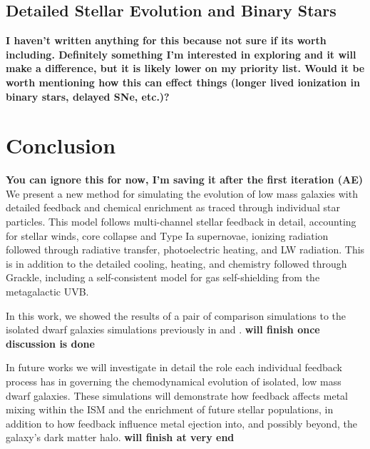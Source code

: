 \documentclass[twocolumn]{aastex61}
\begin{document}
\subsection{Detailed Stellar Evolution and Binary Stars}
\textbf{I haven't written anything for this because not sure if its worth including. Definitely something I'm interested in exploring and it will make a difference, but it is likely lower on my priority list. Would it be worth mentioning how this can effect things (longer lived ionization in binary stars, delayed SNe, etc.)?}

\section{Conclusion}
\textbf{You can ignore this for now, I'm saving it after the first iteration (AE)}
We present a new method for simulating the evolution of low mass galaxies with detailed feedback and chemical enrichment as traced through individual star particles. This model follows multi-channel stellar feedback in detail, accounting for stellar winds, core collapse and Type Ia supernovae, ionizing radiation followed through radiative transfer, photoelectric heating, and LW radiation. This is in addition to the detailed cooling, heating, and chemistry followed through Grackle, including a self-consistent model for gas self-shielding from the metagalactic UVB.

In this work, we showed the results of a pair of comparison simulations to the isolated dwarf galaxies simulations previously in \citep{Hu2016} and \citep{Hu2017}. \textbf{will finish once discussion is done}

In future works we will investigate in detail the role each individual feedback process has in governing the chemodynamical evolution of isolated, low mass dwarf galaxies. These simulations will demonstrate how feedback affects metal mixing within the ISM and the enrichment of future stellar populations, in addition to how feedback influence metal ejection into, and possibly beyond, the galaxy's dark matter halo. \textbf{will finish at very end}

%
%




\appendix
\end{document}
